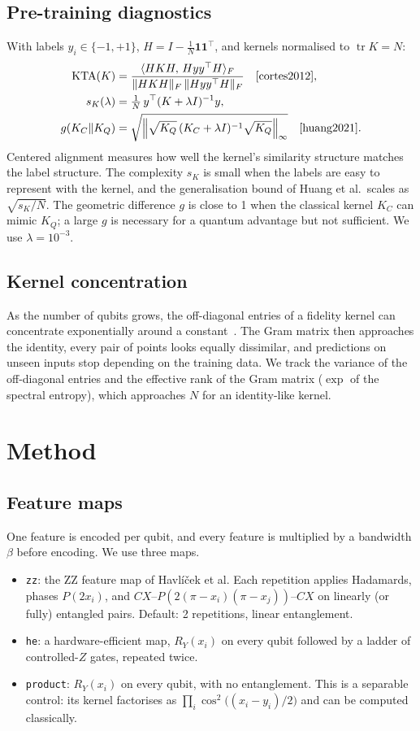 \documentclass[11pt,a4paper]{article}
\newcommand{\tx}[1]{\texttt{#1}}
\begin{document}
\subsection{Pre-training diagnostics}
With labels $y_i\in\{-1,+1\}$, $H=I-\frac{1}{N}\mathbf{1}\mathbf{1}^\top$, and kernels normalised to $\operatorname{tr}K=N$:
\begin{align}
  \mathrm{KTA}(K) &= \frac{\langle HKH,\,H yy^\top H\rangle_F}{\|HKH\|_F\,\|H yy^\top H\|_F} \quad\text{\cite{cortes2012}},\\
  s_K(\lambda) &= \tfrac{1}{N}\,y^\top(K+\lambda I)^{-1}y, \\
  g(K_C\|K_Q) &= \sqrt{\left\|\sqrt{K_Q}\,(K_C+\lambda I)^{-1}\sqrt{K_Q}\right\|_\infty} \quad\text{\cite{huang2021}}.
\end{align}
Centered alignment measures how well the kernel's similarity structure matches the label structure. The complexity $s_K$ is small when the labels are easy to represent with the kernel, and the generalisation bound of Huang et al.\ scales as $\sqrt{s_K/N}$. The geometric difference $g$ is close to 1 when the classical kernel $K_C$ can mimic $K_Q$; a large $g$ is necessary for a quantum advantage but not sufficient. We use $\lambda=10^{-3}$.

\subsection{Kernel concentration}
As the number of qubits grows, the off-diagonal entries of a fidelity kernel can concentrate exponentially around a constant~\cite{thanasilp2024}. The Gram matrix then approaches the identity, every pair of points looks equally dissimilar, and predictions on unseen inputs stop depending on the training data. We track the variance of the off-diagonal entries and the effective rank of the Gram matrix ($\exp$ of the spectral entropy), which approaches $N$ for an identity-like kernel.

\section{Method}\label{sec:method}
\subsection{Feature maps}
One feature is encoded per qubit, and every feature is multiplied by a bandwidth $\beta$ before encoding. We use three maps.
\begin{itemize}
  \item \tx{zz}: the ZZ feature map of Havl\'i\v{c}ek et al. Each repetition applies Hadamards, phases $P(2x_i)$, and $CX$--$P(2(\pi-x_i)(\pi-x_j))$--$CX$ on linearly (or fully) entangled pairs. Default: 2 repetitions, linear entanglement.
  \item \tx{he}: a hardware-efficient map, $R_Y(x_i)$ on every qubit followed by a ladder of controlled-$Z$ gates, repeated twice.
  \item \tx{product}: $R_Y(x_i)$ on every qubit, with no entanglement. This is a separable control: its kernel factorises as $\prod_i\cos^2\!\big((x_i-y_i)/2\big)$ and can be computed classically.
\end{itemize}
\end{document}
